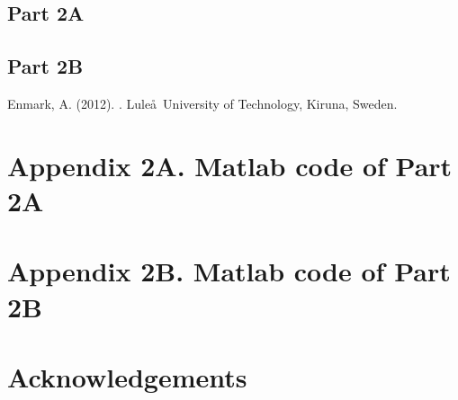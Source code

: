 \documentclass{article}
\begin{document}
\subsection{Part 2A}


\subsection{Part 2B}


\begin{thebibliography}{9}

Enmark, A.  (2012).
.
\newblock Lule\aa \ University of Technology, Kiruna, Sweden.

\end{thebibliography}


\section{Appendix 2A. Matlab code of Part 2A}


\section{Appendix 2B. Matlab code of Part 2B}


\section{Acknowledgements}
\end{document}
